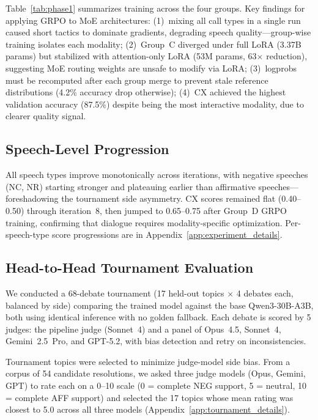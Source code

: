 Table~\ref{tab:phase1} summarizes training across the four groups.
Key findings for applying GRPO to MoE architectures: (1)~mixing all call
types in a single run caused short tactics to dominate gradients, degrading
speech quality---group-wise training isolates each modality; (2)~Group~C
diverged under full LoRA (3.37B params) but stabilized with attention-only
LoRA (53M params, 63$\times$ reduction), suggesting MoE routing weights
are unsafe to modify via LoRA; (3)~logprobs must be recomputed after each
group merge to prevent stale reference distributions (4.2\% accuracy drop
otherwise); (4)~CX achieved the highest validation accuracy (87.5\%)
despite being the most interactive modality, due to clearer quality signal.

\subsection{Speech-Level Progression}
\label{sec:speech_progression}

All speech types improve monotonically across iterations, with negative
speeches (NC, NR) starting stronger and plateauing earlier than affirmative
speeches---foreshadowing the tournament side asymmetry. CX scores remained
flat (0.40--0.50) through iteration~8, then jumped to 0.65--0.75 after
Group~D GRPO training, confirming that dialogue requires modality-specific
optimization. Per-speech-type score progressions are in
Appendix~\ref{app:experiment_details}.

\subsection{Head-to-Head Tournament Evaluation}
\label{sec:tournament}

We conducted a 68-debate tournament (17 held-out topics $\times$ 4 debates
each, balanced by side) comparing the trained model against the base
Qwen3-30B-A3B, both using identical inference with no golden fallback.
Each debate is scored by 5 judges: the pipeline judge (Sonnet~4) and a
panel of Opus~4.5, Sonnet~4, Gemini~2.5~Pro, and GPT-5.2, with bias
detection and retry on inconsistencies.

Tournament topics were selected to minimize judge-model side bias. From a
corpus of 54 candidate resolutions, we asked three judge models (Opus,
Gemini, GPT) to rate each on a 0--10 scale (0 = complete NEG support,
5 = neutral, 10 = complete AFF support) and selected the 17 topics whose
mean rating was closest to 5.0 across all three models
(Appendix~\ref{app:tournament_details}).

